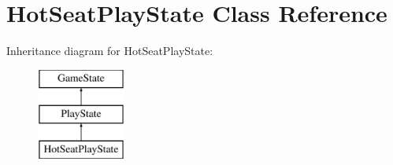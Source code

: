 \hypertarget{class_hot_seat_play_state}{}\section{Hot\+Seat\+Play\+State Class Reference}
\label{class_hot_seat_play_state}
Inheritance diagram for Hot\+Seat\+Play\+State\+:\begin{figure}[H]
\begin{center}
\leavevmode
\includegraphics[height=3.000000cm]{class_hot_seat_play_state}
\end{center}
\end{figure}
